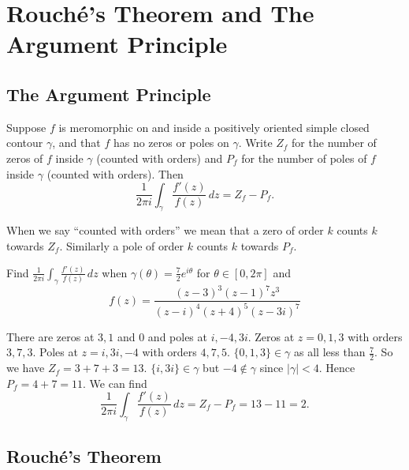 \documentclass[11pt, a4paper]{article}
\begin{document}
\section{Rouch\'e's Theorem and The Argument Principle}

\subsection*{The Argument Principle}

\begin{thmbox}
    Suppose $f$ is meromorphic on and inside a positively oriented simple closed contour $\gamma$,
    and that $f$ has no zeros or poles on $\gamma$.
    Write $Z_f$ for the number of zeros of $f$ inside $\gamma$
    (counted with orders)
    and $P_f$ for the number of poles of $f$ inside $\gamma$
    (counted with orders).
    Then
    \[
    \frac{1}{2\pi i}\int_\gamma\frac{f'(z)}{f(z)}\,dz = Z_f - P_f.
    \]
\end{thmbox}

\begin{warnbox}[Remark 11.17]
    When we say ``counted with orders'' we mean that a zero of order $k$ counts $k$ towards $Z_f$. Similarly a pole of order $k$ counts $k$ towards $P_f$.
\end{warnbox}

\begin{exbox}
    Find $\frac{1}{2\pi i}\int_{\gamma}\frac{f'(z)}{f(z)}\,dz$ when $\gamma(\theta) = \frac{7}{2}e ^ {i\theta}$ for $\theta \in [0, 2\pi]$ and
    \[
    f(z) = \frac{(z - 3) ^ 3(z - 1) ^ 7z ^ 3}{(z - i) ^ 4(z + 4) ^ 5(z - 3i) ^ 7}
    \]

    There are zeros at $3, 1$ and $0$ and poles at $i, -4, 3i$.
    Zeros at $z = 0, 1, 3$ with orders $3, 7, 3$.
    Poles at $z = i, 3i, -4$ with orders $4, 7, 5$.
    $\{0, 1, 3\} \in \gamma$ as all less than $\frac{7}{2}$.
    So we have $Z_f = 3 + 7 + 3 = 13$.
    $\{i, 3i\} \in \gamma$ but $-4 \notin \gamma$ since $|\gamma| < 4$.
    Hence $P_f = 4 + 7 = 11$.
    We can find
    \[
    \frac{1}{2\pi i}\int_{\gamma}\frac{f'(z)}{f(z)}\,dz = Z_f - P_f = 13 - 11 = 2.
    \]
\end{exbox}

\subsection*{Rouch\'e's Theorem}
\end{document}
